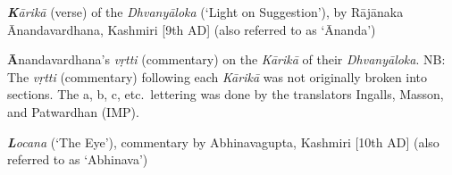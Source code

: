 \documentclass[10pt]{article}
\begin{document}
\begin{description}
	\setlength{\itemsep}{-0.25em}

	\item[K] \textit{\textbf{K}ārikā} (verse) of the \textit{Dhvanyāloka} (`Light on Suggestion'),
	    by Rājānaka \\ Ānandavardhana, Kashmiri [9th AD] (also referred to as `Ānanda')%

	\item[A] \textbf{Ā}nandavardhana's \textit{vṛtti} (commentary) on the \textit{Kārikā} of their \textit{Dhvanyāloka}. 
		NB: The \textit{vṛtti} (commentary) following each \textit{Kārikā} was not originally broken into sections. 
		The a, b, c, etc.\ lettering was done by the translators Ingalls, Masson, and Patwardhan (IMP).

	\item[L] \textit{\textbf{L}ocana} (`The Eye'), commentary by Abhinavagupta, Kashmiri [10th AD]  (also referred to as `Abhinava')
\end{description}
\end{document}
